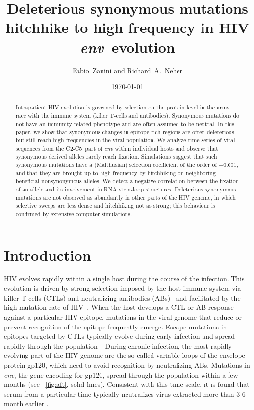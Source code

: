 \documentclass[rmp, twocolumn]{revtex4}
\newcommand{\env}{\textit{env}}
\newcommand{\shankaregion}{C2-C5}
\newcommand{\Author}{Fabio~Zanini and Richard~A.~Neher}
\newcommand{\Title}{Deleterious synonymous mutations hitchhike to high frequency in HIV \env~evolution}
\begin{document}
\title{\Title}
\author{\Author}
\date{\today}

\begin{abstract}
\noindent
Intrapatient HIV evolution is governed by selection on the protein level in the
arms race with the immune system (killer T-cells and antibodies). Synonymous
mutations do not have an immunity-related phenotype and are often assumed to be
neutral. In this paper, we show that synonymous changes in epitope-rich regions
are often deleterious but still reach high frequencies in the viral population.  We analyze time
series of viral sequences from the \shankaregion~part of {\it env} within individual
hosts and observe that synonymous derived alleles rarely reach fixation.
Simulations suggest that such synonymous mutations
have a (Malthusian) selection coefficient of the order of $-0.001$, and that
they are brought up to high frequency by hitchhiking on neighboring beneficial
nonsynonymous alleles. We detect a negative correlation between the fixation of an allele and
its involvement in RNA stem-loop structures.
Deleterious synonymous mutations are not observed as abundantly in other parts of the HIV genome, in which
selective sweeps are less dense and hitchhiking not as strong; this behaviour is
confirmed by extensive computer simulations.

\end{abstract}
\maketitle

\section{Introduction}

HIV evolves rapidly within a single host during the course of the infection.
This evolution is driven by strong selection imposed by the host immune system
via killer T cells (CTLs) and neutralizing antibodies
(ABs)~\citep{rambaut_causes_2004} and facilitated by the high
mutation rate of HIV~\citep{mansky_lower_1995,abram_nature_2010}. When the host
develops a CTL or AB response against a particular HIV epitope, mutations in the viral genome that
reduce or prevent recognition of the epitope frequently emerge. Escape mutations
in epitopes targeted by CTLs typically evolve during early infection and spread
rapidly through the population~\citep{mcmichael_immune_2009}. During chronic
infection, the most rapidly evolving part of the HIV genome are the so called
variable loops of the envelope protein gp120, which need to avoid recognition by
neutralizing ABs.  Mutations in \env, the gene encoding for gp120, spread
through the population within a few months (see \figurename~\ref{fig:aft}, solid
lines). Consistent with this time scale, it is found that serum from a
particular time typically neutralizes virus extracted more than 3-6 month
earlier \citep{richman_rapid_2003}.
\end{document}
